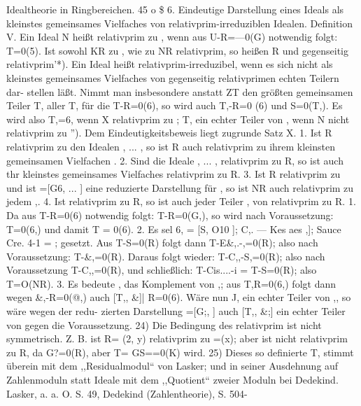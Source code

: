 \documentclass[11pt,a4paper]{article}
\theoremstyle{plain}
\theoremstyle{definition}
\begin{document}
Idealtheorie in Ringbereichen. 
45 
o \$ 6. 
Eindeutige Darstellung eines Ideals als kleinstes gemeinsames Vielfaches 
von relativprim-irreduziblen Idealen. 
Definition V. 
Ein Ideal N heißt relativprim 
zu , wenn 
aus 
U-R=---0(G) notwendig 
folgt: T=0(5). 
Ist sowohl 
KR zu , wie 
 zu NR relativprim, 
so heißen R und  gegenseitig relativprim'*). 
Ein Ideal heißt relativprim-irreduzibel, 
wenn es sich nicht als kleinstes 
gemeinsames Vielfaches von gegenseitig relativprimen echten Teilern dar- 
stellen läßt. 
Nimmt 
man 
insbesondere 
anstatt 
ZT 
den 
größten 
gemeinsamen 
Teiler T, aller T, für die T-R=0(6), 
so wird auch T,-R=0 (6) 
und S=0(T,). 
Es wird 
also T,=6, wenn X relativprim 
zu ; 
T, ein echter Teiler von , wenn N nicht relativprim zu ''). 
Dem Eindeutigkeitsbeweis liegt zugrunde 
Satz X. 
1. Ist R relativprim zu den Idealen , ... , so ist R 
auch relativprim zu ihrem kleinsten gemeinsamen Vielfachen . 
2. Sind die Ideale , ... , relativprim 
zu R, so 
ist auch 
thr 
kleinstes gemeinsames Vielfaches  relativprim zu R. 
3. Ist R relativprim zu  und ist 
 =[G6, ... ] eine reduzierte 
Darstellung für , so ist NR auch relativprim zu jedem ,. 
4. Ist  relativprim 
zu R, so 
ist auch jeder Teiler , von  
relativprim zu R. 
1. Da aus T-R=0(6) notwendig 
folgt: T-R=0(G,), so wird 
nach Voraussetzung: 
T=0(6,) und damit T = 
0(6). 
2. Es sel 6, = [S, O10 ]; 
C,. --- Kes aes ,]; 
Sauce 
Cre. 4-1 = ; 
gesetzt. 
Aus T-S=0(R) 
folgt dann T-E\&,.-,=0(R); 
also nach 
Voraussetzung: T-\&,=0(R). 
Daraus folgt wieder: T-C,,-S,=0(R); 
also nach Voraussetzung T-C,,=0(R), 
und schließlich: 
T-Cis....-i = 
T-S=0(R); 
also T=O(NR). 
3. Es bedeute , das Komplement von ,; aus T,R=0(6,) folgt 
dann wegen \&,-R=0(@,) auch [T,, \&]| R=0(6). 
Wäre nun J, ein echter Teiler von ,, so 
wäre wegen der redu- 
zierten Darstellung  =[G;, ] auch [T,, \&;] ein echter Teiler von  
gegen die Voraussetzung. 
24) Die Bedingung des relativprim ist nicht symmetrisch. 
Z. B. ist 
R= (2\textdegree{}, y) 
relativprim 
zu =(x); 
aber  ist nicht relativprim 
zu R, da G?=0(R), 
aber 
T= GS==0(K) wird. 
25) Dieses 
so 
definierte T, stimmt 
überein 
mit dem ,,Residualmodul`` 
von 
Lasker; und in seiner Ausdehnung auf Zahlenmoduln statt Ideale mit dem ,,Quotient`` 
zweier Moduln bei Dedekind. 
Lasker, a. a. O. S. 49, Dedekind (Zahlentheorie), S. 504-
\end{document}
